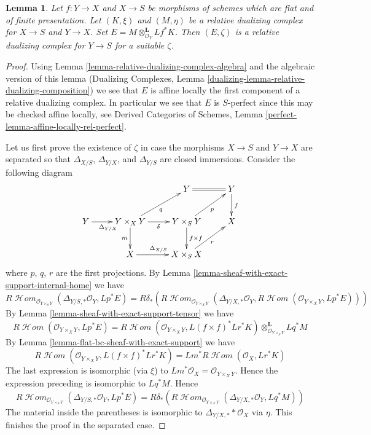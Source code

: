 \documentclass{stacks-project}
\theoremstyle{plain}
\newtheorem{lemma}[subsection]{Lemma}
\theoremstyle{definition}
\theoremstyle{remark}
\numberwithin{equation}{subsection}
\def\SheafHom{\mathop{\mathcal{H}\!\mathit{om}}\nolimits}
\begin{document}
\begin{lemma}
\label{lemma-relative-dualizing-composition}
Let $f : Y \to X$ and $X \to S$ be morphisms of schemes
which are flat and of finite presentation.
Let $(K, \xi)$ and $(M, \eta)$
be a relative dualizing complex for $X \to S$ and $Y \to X$.
Set $E = M \otimes_{\mathcal{O}_Y}^\mathbf{L} Lf^*K$.
Then $(E, \zeta)$ is a relative dualizing complex for $Y \to S$ for
a suitable $\zeta$.
\end{lemma}

\begin{proof}
Using Lemma \ref{lemma-relative-dualizing-complex-algebra}
and the algebraic version of this lemma (Dualizing Complexes, Lemma
\ref{dualizing-lemma-relative-dualizing-composition})
we see that $E$
is affine locally the first component of a relative dualizing complex.
In particular we see that $E$
is $S$-perfect since this may be checked affine locally, see
Derived Categories of Schemes, Lemma
\ref{perfect-lemma-affine-locally-rel-perfect}.

\medskip\noindent
Let us first prove the existence of $\zeta$ in case the
morphisms $X \to S$ and $Y \to X$ are separated so that
$\Delta_{X/S}$, $\Delta_{Y/X}$, and $\Delta_{Y/S}$
are closed immersions. Consider the following diagram
$$
\xymatrix{
& & Y \ar@{=}[r] & Y \ar[d]^f \\
Y \ar[r]_{\Delta_{Y/X}} &
Y \times_X Y \ar[d]_m \ar[r]_\delta \ar[ru]_q &
Y \times_S Y \ar[d]^{f \times f} \ar[ru]_p & X\\
& X \ar[r]^{\Delta_{X/S}} & X \times_S X \ar[ru]_r
}
$$
where $p$, $q$, $r$ are the first projections.
By Lemma \ref{lemma-sheaf-with-exact-support-internal-home}
we have
$$
R\SheafHom_{\mathcal{O}_{Y \times_S Y}}(
\Delta_{Y/S, *}\mathcal{O}_Y, Lp^*E) =
R\delta_*\left(R\SheafHom_{\mathcal{O}_{Y \times_X Y}}(
\Delta_{Y/X, *}\mathcal{O}_Y,
R\SheafHom(\mathcal{O}_{Y \times_X Y}, Lp^*E))\right)
$$
By Lemma \ref{lemma-sheaf-with-exact-support-tensor} we have
$$
R\SheafHom(\mathcal{O}_{Y \times_X Y}, Lp^*E) =
R\SheafHom(\mathcal{O}_{Y \times_X Y}, L(f \times f)^*Lr^*K)
\otimes_{\mathcal{O}_{Y \times_S Y}}^\mathbf{L} Lq^*M
$$
By Lemma \ref{lemma-flat-bc-sheaf-with-exact-support} we have
$$
R\SheafHom(\mathcal{O}_{Y \times_X Y}, L(f \times f)^*Lr^*K) =
Lm^*R\SheafHom(\mathcal{O}_X, Lr^*K)
$$
The last expression is isomorphic (via $\xi$) to
$Lm^*\mathcal{O}_X = \mathcal{O}_{Y \times_X Y}$.
Hence the expression preceding is isomorphic to
$Lq^*M$. Hence
$$
R\SheafHom_{\mathcal{O}_{Y \times_S Y}}(
\Delta_{Y/S, *}\mathcal{O}_Y, Lp^*E) =
R\delta_*\left(R\SheafHom_{\mathcal{O}_{Y \times_X Y}}(
\Delta_{Y/X, *}\mathcal{O}_Y, Lq^*M)\right)
$$
The material inside the parentheses is isomorphic to
$\Delta_{Y/X, *}*\mathcal{O}_X$ via $\eta$.
This finishes the proof in the separated case.


\end{proof}
\end{document}
